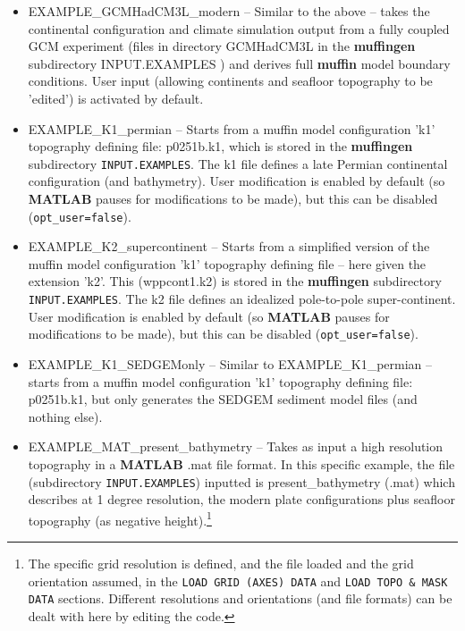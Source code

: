 \documentclass[11pt,fleqn]{book} %
\begin{document}
\begin{itemize}[noitemsep]
\vspace{1mm}
\item \textsf{\footnotesize EXAMPLE\_GCMHadCM3L\_modern} -- Similar to the above -- takes the continental configuration and climate simulation output from a fully coupled GCM experiment (files in directory \footnotesize\textsf{GCMHadCM3L }\normalsize in the \textbf{muffingen} subdirectory \footnotesize\textsf{INPUT.EXAMPLES }\normalsize) and derives full \textbf{muffin} model boundary conditions. User input (allowing continents and seafloor topography to be 'edited') is activated by default.

\vspace{1mm}
\item \textsf{\footnotesize EXAMPLE\_K1\_permian} -- Starts from a muffin model configuration 'k1' topography defining file: \textsf{\footnotesize p0251b.k1}, which is stored in the \textbf{muffingen} subdirectory \texttt{INPUT.EXAMPLES}. The k1 file defines a late Permian continental configuration (and bathymetry). User modification is enabled by default (so \textbf{MATLAB} pauses for modifications to be made), but this can be disabled (\texttt{opt\_user=false}).

\vspace{1mm}
\item \textsf{\footnotesize EXAMPLE\_K2\_supercontinent} -- Starts from a simplified version of the muffin model configuration 'k1' topography defining file -- here given  the extension 'k2'. This (\textsf{\footnotesize wppcont1.k2}) is stored in the \textbf{muffingen} subdirectory \texttt{INPUT.EXAMPLES}. The k2 file defines an idealized pole-to-pole super-continent. User modification is enabled by default (so \textbf{MATLAB} pauses for modifications to be made), but this can be disabled (\texttt{opt\_user=false}).

\vspace{1mm}
\item \textsf{\footnotesize EXAMPLE\_K1\_SEDGEMonly} -- Similar to \textsf{\footnotesize EXAMPLE\_K1\_permian} -- starts from a muffin model configuration 'k1' topography defining file: \textsf{\footnotesize p0251b.k1}, but only generates the SEDGEM sediment model files (and nothing else).

\vspace{1mm}
\item \textsf{\footnotesize EXAMPLE\_MAT\_present\_bathymetry} -- Takes as input a high resolution topography in a \textbf{MATLAB} \textsf{\footnotesize .mat} file format. In this specific example, the file (subdirectory \texttt{INPUT.EXAMPLES}) inputted is \textsf{\footnotesize present\_bathymetry} (\textsf{\footnotesize .mat}) which describes at 1 degree resolution, the modern plate configurations plus seafloor topography (as negative height).\footnote{The specific grid resolution is defined, and the file loaded and the grid orientation assumed, in the \texttt{LOAD GRID (AXES) DATA} and \texttt{LOAD TOPO \& MASK DATA} sections. Different resolutions and orientations (and file formats) can be dealt with here by editing the code.}

\end{itemize}
\vspace{2mm}
\end{document}
